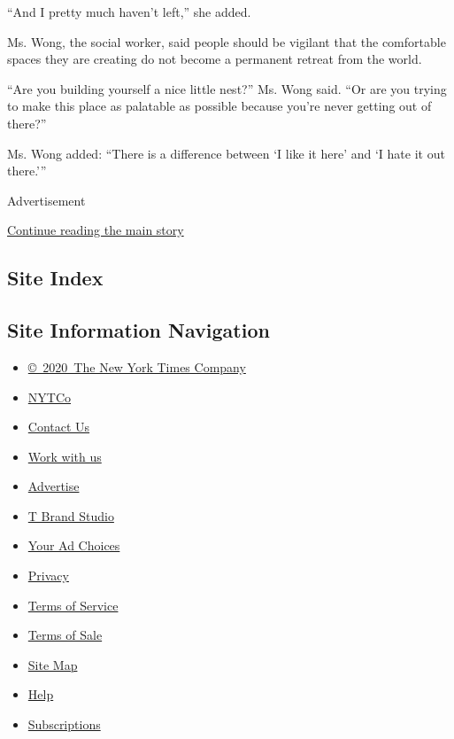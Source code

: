 ``And I pretty much haven't left,'' she added.

Ms. Wong, the social worker, said people should be vigilant that the
comfortable spaces they are creating do not become a permanent retreat
from the world.

``Are you building yourself a nice little nest?'' Ms. Wong said. ``Or
are you trying to make this place as palatable as possible because
you're never getting out of there?''

Ms. Wong added: ``There is a difference between `I like it here' and `I
hate it out there.'''

Advertisement

\protect\hyperlink{after-bottom}{Continue reading the main story}

\hypertarget{site-index}{%
\subsection{Site Index}\label{site-index}}

\hypertarget{site-information-navigation}{%
\subsection{Site Information
Navigation}\label{site-information-navigation}}

\begin{itemize}
\tightlist
\item
  \href{https://help.nytimes3xbfgragh.onion/hc/en-us/articles/115014792127-Copyright-notice}{©~2020~The
  New York Times Company}
\end{itemize}

\begin{itemize}
\tightlist
\item
  \href{https://www.nytco.com/}{NYTCo}
\item
  \href{https://help.nytimes3xbfgragh.onion/hc/en-us/articles/115015385887-Contact-Us}{Contact
  Us}
\item
  \href{https://www.nytco.com/careers/}{Work with us}
\item
  \href{https://nytmediakit.com/}{Advertise}
\item
  \href{http://www.tbrandstudio.com/}{T Brand Studio}
\item
  \href{https://www.nytimes3xbfgragh.onion/privacy/cookie-policy\#how-do-i-manage-trackers}{Your
  Ad Choices}
\item
  \href{https://www.nytimes3xbfgragh.onion/privacy}{Privacy}
\item
  \href{https://help.nytimes3xbfgragh.onion/hc/en-us/articles/115014893428-Terms-of-service}{Terms
  of Service}
\item
  \href{https://help.nytimes3xbfgragh.onion/hc/en-us/articles/115014893968-Terms-of-sale}{Terms
  of Sale}
\item
  \href{https://spiderbites.nytimes3xbfgragh.onion}{Site Map}
\item
  \href{https://help.nytimes3xbfgragh.onion/hc/en-us}{Help}
\item
  \href{https://www.nytimes3xbfgragh.onion/subscription?campaignId=37WXW}{Subscriptions}
\end{itemize}
